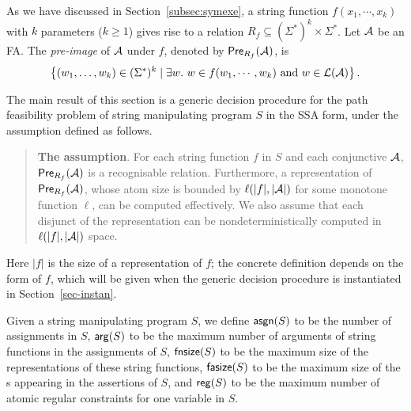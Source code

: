 As we have discussed in Section~\ref{subsec:symexe}, a string function $f(x_1, \cdots, x_k)$ with $k$ parameters ($k\geq 1$) gives rise to a relation $R_f\subseteq (\Sigma^*)^k \times \Sigma^*$. Let $\mathcal{A}$ be an FA. The \emph{pre-image} of $\mathcal{A}$ under $f$, denoted by $\textsf{Pre}_{R_f}(\mathcal{A})$, is 
\[\left\{(w_1,\ldots, w_k) \in (\Sigma^*)^k \mid \exists w.\ w\in f(w_1, \cdots, w_k)\text{ and } w\in\mathcal{L}(\mathcal{A}) \right\}.\]

%

The main result of this section is a generic decision procedure for the path feasibility problem of string manipulating program $S$ in the SSA form, under the \prerec{} assumption defined as follows.
\begin{quote}
{\bf The \prerec{} assumption}. For each string function $f$ in $S$ and each conjunctive \FA{} $\mathcal{A}$,  $\textsf{Pre}_{R_f}(\mathcal{A})$ is a recognisable relation. Furthermore, 
a representation of $\textsf{Pre}_{R_f}(\mathcal{A})$, whose atom size is bounded by  $\ell(|f|, |\mathcal{A}|)$ for some monotone function $\ell$, can be computed effectively. We also assume that each disjunct of the representation can be nondeterministically computed in $\ell(|f|, |\mathcal{A}|)$ space.
%
\end{quote} 
%
Here $|f|$ is the size of a representation of $f$; the concrete definition depends on the form of $f$, which will be given when the generic decision procedure is instantiated in Section~\ref{sec-instan}. 

Given a string manipulating program $S$, 
we define $\mathsf{asgn}(S)$ to be the number of assignments in $S$, $\mathsf{arg}(S)$ to be the maximum number of arguments of string functions in the assignments of $S$, $\mathsf{fnsize}(S)$ to be the maximum size of the representations of these string functions, $\mathsf{fasize}(S)$ to be the maximum size of the \FA{}s appearing in the assertions of $S$, and $\mathsf{reg}(S)$ to be the maximum number of atomic regular constraints for one variable in $S$.


